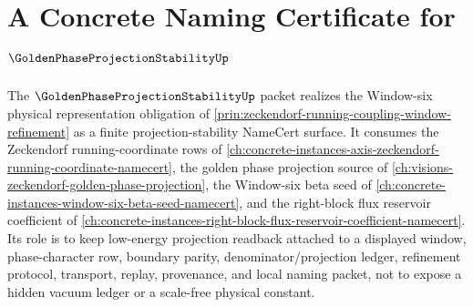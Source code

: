 \chapter{A Concrete Naming Certificate for $\GoldenPhaseProjectionStabilityUp$}
\label{ch:concrete-instances-golden-phase-projection-stability-namecert}

The $\GoldenPhaseProjectionStabilityUp$ packet realizes the Window-six physical representation obligation of \autoref{prin:zeckendorf-running-coupling-window-refinement} as a finite projection-stability NameCert surface. It consumes the Zeckendorf running-coordinate rows of \autoref{ch:concrete-instances-axis-zeckendorf-running-coordinate-namecert}, the golden phase projection source of \autoref{ch:visions-zeckendorf-golden-phase-projection}, the Window-six beta seed of \autoref{ch:concrete-instances-window-six-beta-seed-namecert}, and the right-block flux reservoir coefficient of \autoref{ch:concrete-instances-right-block-flux-reservoir-coefficient-namecert}. Its role is to keep low-energy projection readback attached to a displayed window, phase-character row, boundary parity, denominator/projection ledger, refinement protocol, transport, replay, provenance, and local naming packet, not to expose a hidden vacuum ledger or a scale-free physical constant.

